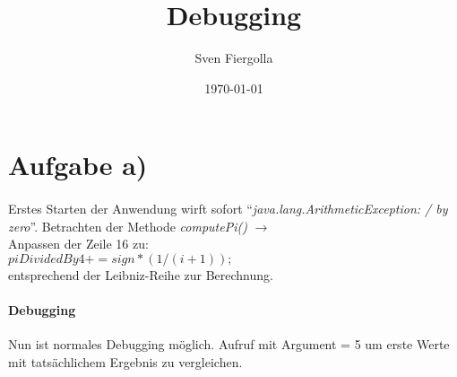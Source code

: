 \documentclass[10pt, a4paper]{article}
\author{Sven Fiergolla}
\title{Debugging}
\date{\today}
\begin{document}
\maketitle

\section*{Aufgabe a)}
\paragraph{}
Erstes Starten der Anwendung wirft sofort \enquote{\textit{java.lang.ArithmeticException: / by zero}}. Betrachten der Methode \textit{computePi()} $\rightarrow$\\
Anpassen der Zeile 16 zu: \\
$piDividedBy4 += sign * (1 / (i + 1));$ \\
entsprechend der Leibniz-Reihe zur Berechnung.\par
\bigskip

\paragraph{Debugging}
Nun ist normales Debugging möglich. Aufruf mit Argument = 5 um erste Werte mit tatsächlichem Ergebnis zu vergleichen.\\
\end{document}
